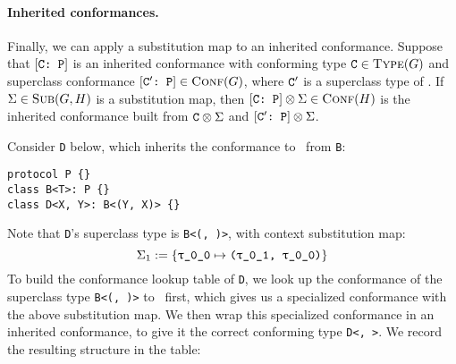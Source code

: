 \documentclass[../generics]{subfiles}
\begin{document}
\paragraph{Inherited conformances.}
Finally, we can apply a substitution map to an inherited conformance. Suppose that $[\texttt{C:~P}]$ is an inherited conformance with conforming type $\texttt{C} \in \textsc{Type}({G})$ and superclass conformance $[\texttt{$\texttt{C}^\prime$:~P}] \in \textsc{Conf}({G})$, where $\texttt{C}^\prime$ is a superclass type of \tC. If $\Sigma \in \textsc{Sub}({G, H})$ is a substitution map, then  $[\texttt{C:~P}] \otimes \Sigma \in \textsc{Conf}({H})$ is the inherited conformance built from $\texttt{C} \otimes \Sigma$ and $[\texttt{$\texttt{C}^\prime$:~P}] \otimes \Sigma$.

\begin{example}\label{inherited specialized conf}
Consider \texttt{D} below, which inherits the conformance to \tP\ from \texttt{B}:
\begin{Verbatim}
protocol P {}
class B<T>: P {}
class D<X, Y>: B<(Y, X)> {}
\end{Verbatim}
Note that \texttt{D}'s superclass type is \texttt{B<(\rU, \rT)>}, with context substitution map:
\[\Sigma_1 := \SubstMap{\SubstType{\rT}{(\rU, \rT)}}\]
To build the conformance lookup table of \texttt{D}, we look up the conformance of the superclass type \texttt{B<(\rU, \rT)>} to \tP\ first, which gives us a specialized conformance with the above substitution map. We then wrap this specialized conformance in an inherited conformance, to give it the correct conforming type \texttt{D<\rT, \rU>}. We record the resulting structure in the table:
\begin{center}
\end{center}
\end{example}
\end{document}
